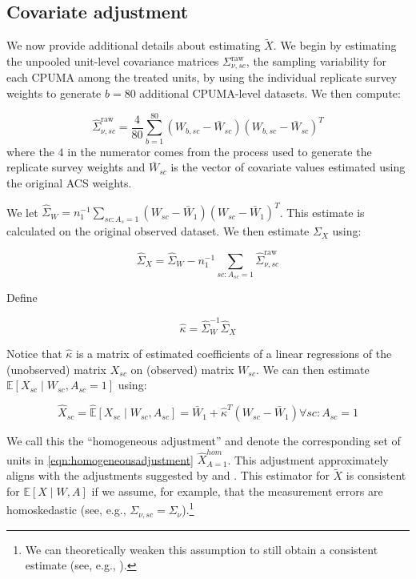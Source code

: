 \subsection{Covariate adjustment}

We now provide additional details about estimating $\tilde{X}$. We begin by estimating the unpooled unit-level covariance matrices $\Sigma_{\nu, sc}^{\text{raw}}$, the sampling variability for each CPUMA among the treated units, by using the individual replicate survey weights to generate $b = 80$ additional CPUMA-level datasets. We then compute:

\begin{equation}
\hat{\Sigma}_{\nu, sc}^{\text{raw}} = \frac{4}{80}\sum_{b=1}^{80}(W_{b, sc} - \bar{W}_{sc})(W_{b, sc} - \bar{W}_{sc})^T
\end{equation}
%
where the $4$ in the numerator comes from the process used to generate the replicate survey weights and $\bar{W}_{sc}$ is the vector of covariate values estimated using the original ACS weights.

We let $\hat{\Sigma}_{W} = n_1^{-1}\sum_{sc: A_s = 1} (W_{sc} - \bar{W}_1)(W_{sc} - \bar{W}_1)^T$. This estimate is calculated on the original observed dataset. We then estimate $\Sigma_{X}$ using:

\begin{equation}
\hat{\Sigma}_X = \hat{\Sigma}_W - n_1^{-1}\sum_{sc: A_{sc} = 1} \hat{\Sigma}_{\nu, sc}^{\text{raw}}
\end{equation}

Define

\begin{equation}
\hat{\kappa} = \hat{\Sigma}_W^{-1}\hat{\Sigma}_X
\end{equation}

Notice that $\hat{\kappa}$ is a matrix of estimated coefficients of a linear regressions of the (unobserved) matrix $X_{sc}$ on (observed) matrix $W_{sc}$. We can then estimate $\mathbb{E}[X_{sc} \mid W_{sc}, A_{sc} = 1]$ using: 

\begin{equation}\label{eqn:homogeneousadjustment}
\hat{X}_{sc} = \hat{\mathbb{E}}[X_{sc} \mid W_{sc}, A_{sc}] = \bar{W}_1 + \hat{\kappa}^T(W_{sc} - \bar{W}_1) \forall sc: A_{sc} = 1
\end{equation}

We call this the ``homogeneous adjustment'' and denote the corresponding set of units in \eqref{eqn:homogeneousadjustment} $\hat{X}_{A=1}^{hom}$. This adjustment approximately aligns with the adjustments suggested by \cite{carroll2006measurement} and \cite{gleser1992importance}. This estimator for $\tilde{X}$ is consistent for $\mathbb{E}[X \mid W, A]$ if we assume, for example, that the measurement errors are homoskedastic (see, e.g., $\Sigma_{\nu, sc} = \Sigma_{\nu}$).\footnote{We can theoretically weaken this assumption to still obtain a consistent estimate (see, e.g., \cite{buonaccorsi2010measurement}).}

